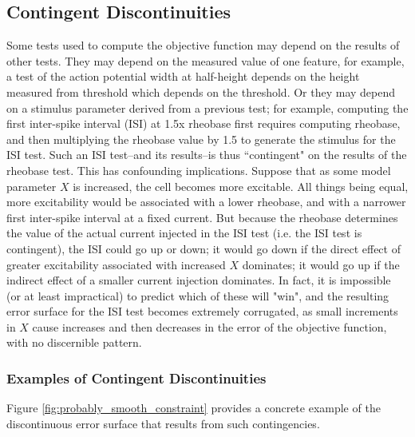 \subsection{Contingent Discontinuities}
\label{sec:contingent_discontinous}
Some tests used to compute the objective function may depend on the results of other tests.
They may depend on the measured value of one feature, for example, a test of the action potential width at half-height depends on the height measured from threshold which depends on the threshold.
Or they may depend on a stimulus parameter derived from a previous test; for example, computing the first inter-spike interval (ISI) at 1.5x rheobase first requires computing rheobase, and then multiplying the rheobase value by 1.5 to generate the stimulus for the ISI test.
Such an ISI test--and its results--is thus ``contingent" on the results of the rheobase test.
This has confounding implications.
Suppose that as some model parameter $X$ is increased, the cell becomes more excitable.
All things being equal, more excitability would be associated with a lower rheobase, and with a narrower first inter-spike interval at a fixed current.
But because the rheobase determines the value of the actual current injected in the ISI test (i.e. the ISI test is contingent), the ISI could go up or down; it would go down if the direct effect of greater excitability associated with increased $X$ dominates; it would go up if the indirect effect of a smaller current injection dominates.
In fact, it is impossible (or at least impractical) to predict which of these will "win", and the resulting error surface for the ISI test becomes extremely corrugated, as small increments in $X$ cause increases and then decreases in the error of the objective function, with no discernible pattern.

\subsubsection{Examples of Contingent Discontinuities}
Figure \ref{fig:probably_smooth_constraint} provides a concrete example of the discontinuous error surface that results from such contingencies.

